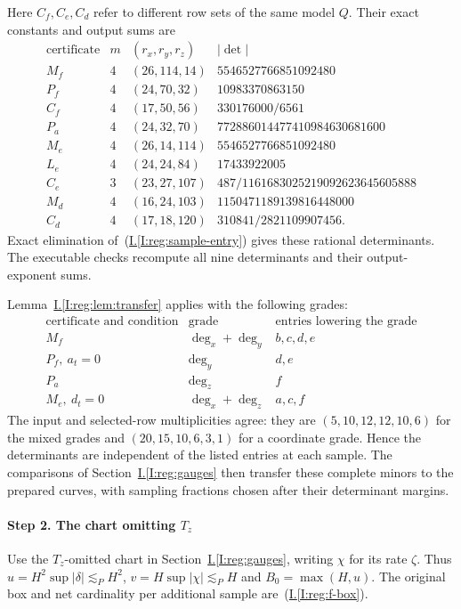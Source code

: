 \documentclass[11pt]{amsart}
\theoremstyle{definition}
\theoremstyle{remark}
\numberwithin{equation}{section}
\newcommand{\partIref}[1]{\hyperref[I:#1]{I.\ref*{I:#1}}}
\newcommand{\partIeqref}[1]{\textup{(\partIref{#1})}}
\begin{document}
Here $C_f,C_e,C_d$ refer to different row sets of the same model $Q$. Their exact constants and output sums are
\[
\begin{array}{c|c|c|r}
\text{certificate}&m&(r_x,r_y,r_z)&|\det|\\\hline
M_f&4&(26,114,14)&5546527766851092480\\
P_f&4&(24,70,32)&10983370863150\\
C_f&4&(17,50,56)&330176000/6561\\
P_a&4&(24,32,70)&772886014477410984630681600\\
M_e&4&(26,14,114)&5546527766851092480\\
L_e&4&(24,24,84)&17433922005\\
C_e&3&(23,27,107)&487/1161683025219092623645605888\\
M_d&4&(16,24,103)&1150471189139816448000\\
C_d&4&(17,18,120)&310841/2821109907456.
\end{array}
\]
Exact elimination of~\partIeqref{reg:sample-entry} gives these rational determinants. The executable checks recompute all nine determinants and their output-exponent sums.

Lemma~\partIref{reg:lem:transfer} applies with the following grades:
\[
\begin{array}{c|c|c}
\text{certificate and condition}&\text{grade}&\text{entries lowering the grade}\\\hline
M_f&\deg_x+\deg_y&b,c,d,e\\
P_f,\ a_t=0&\deg_y&d,e\\
P_a&\deg_z&f\\
M_e,\ d_t=0&\deg_x+\deg_z&a,c,f
\end{array}
\]
The input and selected-row multiplicities agree: they are $(5,10,12,12,10,6)$ for the mixed grades and $(20,15,10,6,3,1)$ for a coordinate grade. Hence the determinants are independent of the listed entries at each sample. The comparisons of Section~\partIref{reg:gauges} then transfer these complete minors to the prepared curves, with sampling fractions chosen after their determinant margins.

\paragraph{Step 2. The chart omitting $T_z$}

Use the $T_z$-omitted chart in Section~\partIref{reg:gauges}, writing $\chi$ for its rate $\zeta$. Thus $u=H^2\sup|\delta|\lesssim_PH^2$, $v=H\sup|\chi|\lesssim_PH$ and $B_0=\max(H,u)$. The original box and net cardinality per additional sample are~\partIeqref{reg:f-box}.
\end{document}
